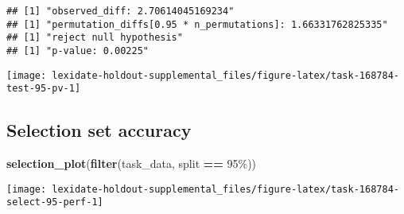 \documentclass[
]{book}
\newenvironment{Shaded}{\begin{snugshade}}{\end{snugshade}}
\newcommand{\AttributeTok}[1]{\textcolor[rgb]{0.13,0.29,0.53}{#1}}
\newcommand{\DecValTok}[1]{\textcolor[rgb]{0.00,0.00,0.81}{#1}}
\newcommand{\FunctionTok}[1]{\textcolor[rgb]{0.13,0.29,0.53}{\textbf{#1}}}
\newcommand{\NormalTok}[1]{#1}
\newcommand{\OtherTok}[1]{\textcolor[rgb]{0.56,0.35,0.01}{#1}}
\newcommand{\SpecialCharTok}[1]{\textcolor[rgb]{0.81,0.36,0.00}{\textbf{#1}}}
\newcommand{\StringTok}[1]{\textcolor[rgb]{0.31,0.60,0.02}{#1}}
\begin{document}
\begin{Shaded}
\end{Shaded}

\begin{verbatim}
## [1] "observed_diff: 2.70614045169234"
## [1] "permutation_diffs[0.95 * n_permutations]: 1.66331762825335"
## [1] "reject null hypothesis"
## [1] "p-value: 0.00225"
\end{verbatim}

\texttt{[image: lexidate-holdout-supplemental\_files/figure-latex/task-168784-test-95-pv-1]}

\hypertarget{selection-set-accuracy-54}{%
\subsection{Selection set accuracy}\label{selection-set-accuracy-54}}

\begin{Shaded}
\begin{Highlighting}[]
\FunctionTok{selection\_plot}\NormalTok{(}\FunctionTok{filter}\NormalTok{(task\_data, split }\SpecialCharTok{==} \StringTok{\textquotesingle{}95\%\textquotesingle{}}\NormalTok{))}
\end{Highlighting}
\end{Shaded}

\texttt{[image: lexidate-holdout-supplemental\_files/figure-latex/task-168784-select-95-perf-1]}
\end{document}
